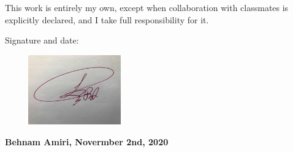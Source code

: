 \documentclass[fleqn]{article}
\begin{document}
\bigbreak

\Large This work is entirely my own, except when collaboration with classmates is explicitly declared, and I take full responsibility for it.

\bigbreak

\Large Signature and date:

\bigbreak

\bigbreak


\includegraphics[height=3cm, width=6cm]{signature.jpg}

\Large \textbf{ Behnam Amiri, Novermber 2nd, 2020 }


\pagebreak
\end{document}
